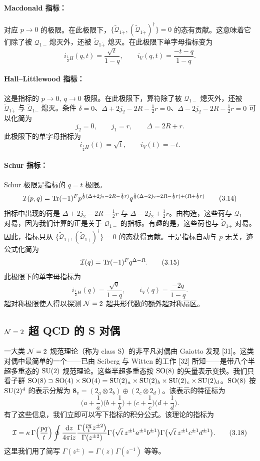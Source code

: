 \paragraph{Macdonald 指标：} 对应 $p\to0$ 的极限。在此极限下，$\{\tilde{\mathcal{Q}}_{1\dot+},(\tilde{\mathcal{Q}}_{1\dot+})^\dagger\}=0$ 的态有贡献。这意味着它们除了被 $\mathcal{Q}_{1-}$$\,$熄灭外，还被 $\tilde{\mathcal{Q}}_{1\dot+}$ 熄灭。在此极限下单字母指标变为
\[
i_{\frac12 H}(q,t)=\frac{\sqrt t}{1-q},\qquad i_V(q,t)=\frac{-t-q}{1-q} .
\tag{3.11}
\]
\paragraph{Hall–Littlewood 指标：} 这是指标的 $p\to0,\ q\to0$ 极限。在此极限下，算符除了被 $\mathcal{Q}_{1-}$ 熄灭外，还被 $\tilde{\mathcal{Q}}_{1\dot+}$ 与 $\tilde{\mathcal{Q}}_{1\dot-}$ 熄灭。条件 $\delta=0$、$\Delta+2j_2-2R-\frac12 r=0$、$\Delta-2j_2-2R-\frac12 r=0$ 可以化简为
\[
j_2=0,\qquad j_1=r,\qquad \Delta=2R+r .
\tag{3.12}
\]
此极限下的单字母指标为
\[
i_{\frac12 H}(t)=\sqrt t,\qquad i_V(t)=-t .
\tag{3.13}
\]
\paragraph{Schur 指标：} Schur 极限是指标的 $q=t$ 极限。
\[
\mathcal{I}(p,q)=\operatorname{Tr}(-1)^F p^{\frac12(\Delta+2j_2-2R-\frac12 r)}q^{\frac12(\Delta-2j_2-2R-\frac12 r)+(R+\frac12 r)}
\tag{3.14}
\]
指标中出现的荷是 $\Delta+2j_2-2R-\frac12 r$ 与 $\Delta-2j_2+\frac12 r$。由构造，这些荷与 $\mathcal{Q}_{1-}$ 对易，因为我们计算的正是关于 $\mathcal{Q}_{1-}$ 的指标。有趣的是，这些荷也与 $\tilde{\mathcal{Q}}_{1\dot+}$ 对易。因此，指标只从 $\{\tilde{\mathcal{Q}}_{1\dot+},(\tilde{\mathcal{Q}}_{1\dot+})^\dagger\}=0$ 的态获得贡献。于是指标自动与 $p$ 无关，迹公式化简为
\[
\mathcal{I}(q)=\operatorname{Tr}(-1)^F q^{\Delta-R} .
\tag{3.15}
\]
此极限下的单字母指标为
\[
i_{\frac12 H}(q)=\frac{\sqrt q}{1-q},\qquad i_V(q)=\frac{-2q}{1-q} .
\tag{3.16}
\]
超对称极限使人得以探测 $\mathcal{N}=2$ 超共形代数的额外超对称扇区。
\subsection{$\mathcal{N}=2$ 超 QCD 的 S 对偶}
一大类 $\mathcal{N}=2$ 规范理论（称为 class S）的非平凡对偶由 Gaiotto 发现 [31]。这类对偶中最简单的一个——已由 Seiberg 与 Witten 的工作 [32] 所知——是带八个半超多重态的 $\operatorname{SU}(2)$ 规范理论。这些半超多重态按 $\operatorname{SO}(8)$ 的矢量表示变换。我们只看子群 $\operatorname{SO}(8)\supset\operatorname{SO}(4)\times\operatorname{SO}(4)=\operatorname{SU}(2)_a\times\operatorname{SU}(2)_b\times\operatorname{SU}(2)_c\times\operatorname{SU}(2)_d$。$\operatorname{SO}(8)$ 按 $\operatorname{SU}(2)^4$ 的表示分解为 $\mathbf{8}_v=(2_a\otimes2_b)\oplus(2_c\otimes2_d)$。该表示的特征标为
\[
\Big(a+\frac1a\Big)\Big(b+\frac1b\Big)+\Big(c+\frac1c\Big)\Big(d+\frac1d\Big) .
\tag{3.17}
\]
有了这些信息，我们立即可以写下指标的积分公式。该理论的指标为
\[
\mathcal{I}=\kappa\,\Gamma\Big(\frac{pq}{t}\Big)\oint\frac{\mathrm{d} z}{4\pi\mathrm{i} z}\frac{\Gamma\big(\frac{pq}{t}z^{\pm2}\big)}{\Gamma(z^{\pm2})}\Gamma\big(\sqrt t\,z^{\pm1}a^{\pm1}b^{\pm1}\big)\Gamma\big(\sqrt t\,z^{\pm1}c^{\pm1}d^{\pm1}\big) .
\tag{3.18}
\]
这里我们用了简写 $\Gamma(z^\pm)=\Gamma(z)\Gamma(z^{-1})$ 等等。

